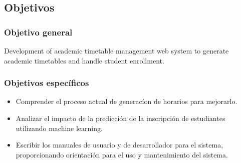 \subsection{Objetivos}

\subsubsection{Objetivo general}
Development of academic timetable management web system to generate academic timetables and handle student enrollment.

\subsubsection{Objetivos específicos}

\begin{itemize}
    \item Comprender el proceso actual de generacíon de horarios para mejorarlo.
    \item Analizar el impacto de la predicción de la inscripción de estudiantes utilizando machine learning.
    \item Escribir los manuales de usuario y de desarrollador para el sistema, proporcionando orientación para el uso y mantenimiento del sistema.
\end{itemize}


